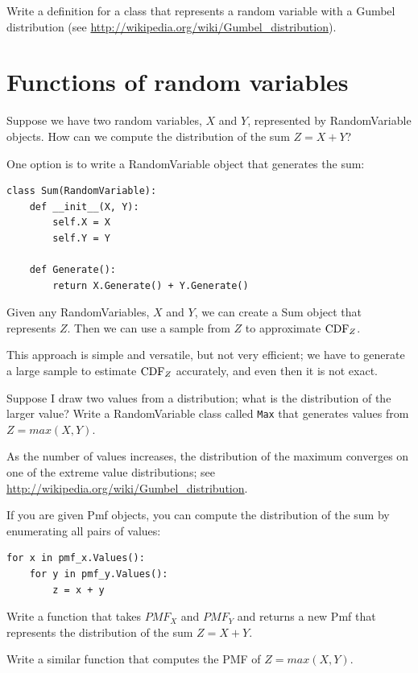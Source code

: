 \documentclass[12pt]{book}
\begin{document}
\begin{exercise}
Write a definition for a class that represents a random variable
with a Gumbel distribution (see \url{http://wikipedia.org/wiki/Gumbel_distribution}).

\end{exercise}


\section{Functions of random variables}

Suppose we have two random variables, $X$ and $Y$, represented
by RandomVariable objects.
How can we compute the distribution of the sum $Z = X + Y$?

One option is to write a RandomVariable object that generates
the sum:
%
\begin{verbatim}
class Sum(RandomVariable):
    def __init__(X, Y):
        self.X = X
        self.Y = Y

    def Generate():
        return X.Generate() + Y.Generate()
\end{verbatim}

Given any RandomVariables, $X$ and $Y$, we can create a Sum
object that represents $Z$.  Then we can use a sample from $Z$ to
approximate $\mathrm{CDF}_{Z}$.

This approach is simple and versatile, but not very efficient; we
have to generate a large sample to estimate $\mathrm{CDF}_{Z}$ accurately, and
even then it is not exact.


\begin{exercise}
Suppose I draw two values from a distribution; what is the distribution
of the larger value?  Write a RandomVariable class called {\tt Max}
that generates values from $Z = max(X, Y)$.

As the number of values increases, the distribution of the maximum
converges on one of the extreme value distributions; see
\url{http://wikipedia.org/wiki/Gumbel_distribution}.

\end{exercise}

\begin{exercise}
If you are given Pmf objects, you can compute the distribution of
the sum by enumerating all pairs of values:
%
\begin{verbatim}
for x in pmf_x.Values():
    for y in pmf_y.Values():
        z = x + y
\end{verbatim}

Write a function that takes $PMF_{X}$ and
$PMF_{Y}$ and returns a new Pmf that represents the distribution of
the sum $Z = X + Y$.

Write a similar function that computes the PMF of $Z = max(X, Y)$.

\end{exercise}
\end{document}
